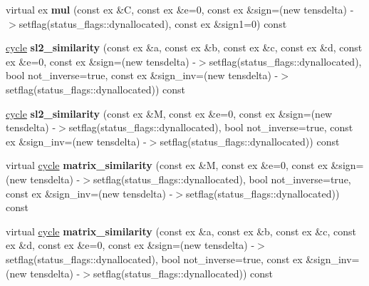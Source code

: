 \begin{DoxyCompactItemize}
\item 
\mbox{\label{class_moeb_inv_1_1cycle_ab4cc0f69a116bc06af1b3184078c857d}} 
virtual ex {\bfseries mul} (const ex \&C, const ex \&e=0, const ex \&sign=(new tensdelta) -\/$>$setflag(status\+\_\+flags\+::dynallocated), const ex \&sign1=0) const
\item 
\mbox{\label{class_moeb_inv_1_1cycle_ad87bfcbb4f37d606d994a20358ec5d3f}} 
\mbox{\hyperlink{class_moeb_inv_1_1cycle}{cycle}} {\bfseries sl2\+\_\+similarity} (const ex \&a, const ex \&b, const ex \&c, const ex \&d, const ex \&e=0, const ex \&sign=(new tensdelta) -\/$>$setflag(status\+\_\+flags\+::dynallocated), bool not\+\_\+inverse=true, const ex \&sign\+\_\+inv=(new tensdelta) -\/$>$setflag(status\+\_\+flags\+::dynallocated)) const
\item 
\mbox{\label{class_moeb_inv_1_1cycle_a8a87c052f2d9128b3137186da05ff22d}} 
\mbox{\hyperlink{class_moeb_inv_1_1cycle}{cycle}} {\bfseries sl2\+\_\+similarity} (const ex \&M, const ex \&e=0, const ex \&sign=(new tensdelta) -\/$>$setflag(status\+\_\+flags\+::dynallocated), bool not\+\_\+inverse=true, const ex \&sign\+\_\+inv=(new tensdelta) -\/$>$setflag(status\+\_\+flags\+::dynallocated)) const
\item 
\mbox{\label{class_moeb_inv_1_1cycle_a5c31fa1602c633af97f7703436d59392}} 
virtual \mbox{\hyperlink{class_moeb_inv_1_1cycle}{cycle}} {\bfseries matrix\+\_\+similarity} (const ex \&M, const ex \&e=0, const ex \&sign=(new tensdelta) -\/$>$setflag(status\+\_\+flags\+::dynallocated), bool not\+\_\+inverse=true, const ex \&sign\+\_\+inv=(new tensdelta) -\/$>$setflag(status\+\_\+flags\+::dynallocated)) const
\item 
\mbox{\label{class_moeb_inv_1_1cycle_a571d091fd4e98904d7ae878f244dd549}} 
virtual \mbox{\hyperlink{class_moeb_inv_1_1cycle}{cycle}} {\bfseries matrix\+\_\+similarity} (const ex \&a, const ex \&b, const ex \&c, const ex \&d, const ex \&e=0, const ex \&sign=(new tensdelta) -\/$>$setflag(status\+\_\+flags\+::dynallocated), bool not\+\_\+inverse=true, const ex \&sign\+\_\+inv=(new tensdelta) -\/$>$setflag(status\+\_\+flags\+::dynallocated)) const
\item 
\mbox{\label{class_moeb_inv_1_1cycle_a0064156ee80dc1f1f6a1d3360d48f9a2}} 

\end{DoxyCompactItemize}
